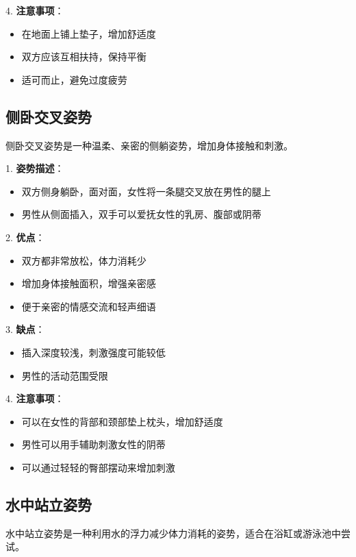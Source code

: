 \documentclass[12pt,UTF8]{ctexbook}
\begin{document}
4. \textbf{注意事项}：
  \begin{itemize}
  \item 在地面上铺上垫子，增加舒适度
  \item 双方应该互相扶持，保持平衡
  \item 适可而止，避免过度疲劳
  \end{itemize}

\subsection{侧卧交叉姿势}

侧卧交叉姿势是一种温柔、亲密的侧躺姿势，增加身体接触和刺激。

1. \textbf{姿势描述}：
  \begin{itemize}
  \item 双方侧身躺卧，面对面，女性将一条腿交叉放在男性的腿上
  \item 男性从侧面插入，双手可以爱抚女性的乳房、腹部或阴蒂
  \end{itemize}

2. \textbf{优点}：
  \begin{itemize}
  \item 双方都非常放松，体力消耗少
  \item 增加身体接触面积，增强亲密感
  \item 便于亲密的情感交流和轻声细语
  \end{itemize}

3. \textbf{缺点}：
  \begin{itemize}
  \item 插入深度较浅，刺激强度可能较低
  \item 男性的活动范围受限
  \end{itemize}

4. \textbf{注意事项}：
  \begin{itemize}
  \item 可以在女性的背部和颈部垫上枕头，增加舒适度
  \item 男性可以用手辅助刺激女性的阴蒂
  \item 可以通过轻轻的臀部摆动来增加刺激
  \end{itemize}

\subsection{水中站立姿势}

水中站立姿势是一种利用水的浮力减少体力消耗的姿势，适合在浴缸或游泳池中尝试。
\end{document}
